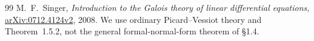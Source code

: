 \documentclass[11pt]{article}
\numberwithin{equation}{section}
\theoremstyle{definition}
\theoremstyle{remark}
\begin{document}
\begin{thebibliography}{99}
 M.~F.~Singer,
 \emph{Introduction to the Galois theory of linear differential equations},
 \href{https://arxiv.org/abs/0712.4124}{arXiv:0712.4124v2}, 2008.
 We use ordinary Picard--Vessiot theory and Theorem~1.5.2, not the
 general formal-normal-form theorem of \S1.4.

\end{thebibliography}
\end{document}
